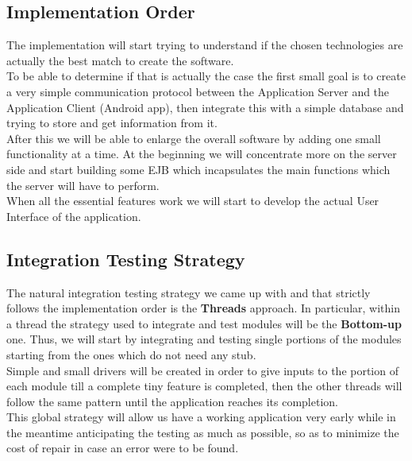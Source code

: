 \subsection{Implementation Order}
The implementation will start trying to understand if the chosen technologies are actually the best match to create the software.
\\To be able to determine if that is actually the case the first small goal is to create a very simple communication protocol between the Application Server and the Application Client (Android app), then integrate this with a simple database and trying to store and get information from it.
\\After this we will be able to enlarge the overall software by adding one small functionality at a time. At the beginning we will concentrate more on the server side and start building some EJB which incapsulates the main functions which the server will have to perform.
\\When all the essential features work we will start to develop the actual User Interface of the application.

\subsection{Integration Testing Strategy}
The natural integration testing strategy we came up with and that strictly follows the implementation order is the \textbf{Threads} approach. In particular, within a thread the strategy used to integrate and test modules will be the \textbf{Bottom-up} one. Thus, we will start by integrating and testing single portions of the modules starting from the ones which do not need any stub. 
\\Simple and small drivers will be created in order to give inputs to the portion of each module till a complete tiny feature is completed, then the other threads will follow the same pattern until the application reaches its completion.
\\This global strategy will allow us have a working application very early while in the meantime anticipating the testing as much as possible, so as to minimize the cost of repair in case an error were to be found.